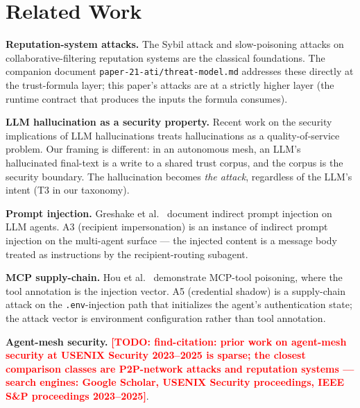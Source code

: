 \documentclass[letterpaper,twocolumn,10pt]{article}
\newcommand{\todo}[1]{\textcolor{red}{\textbf{[TODO: #1]}}}
\begin{document}
\section{Related Work}
\label{sec:related}

\textbf{Reputation-system attacks.} The Sybil attack
\cite{TODO-find-citation-douceur-2002-sybil} and slow-poisoning
attacks on collaborative-filtering reputation systems
\cite{TODO-find-citation-recsys-poisoning} are the classical
foundations. The companion document
\texttt{paper-21-ati/threat-model.md} addresses these directly at
the trust-formula layer; this paper's attacks are at a strictly
higher layer (the runtime contract that produces the inputs the
formula consumes).

\textbf{LLM hallucination as a security property.} Recent work on
the security implications of LLM hallucinations
\cite{TODO-find-citation-llm-hallucination-security-2024} treats
hallucinations as a quality-of-service problem. Our framing is
different: in an autonomous mesh, an LLM's hallucinated final-text
is a write to a shared trust corpus, and the corpus is the security
boundary. The hallucination becomes \emph{the attack}, regardless of
the LLM's intent (T3 in our taxonomy).

\textbf{Prompt injection.} Greshake et al.\
\cite{TODO-find-citation-greshake-prompt-injection-2023} document
indirect prompt injection on LLM agents. A3 (recipient
impersonation) is an instance of indirect prompt injection on the
multi-agent surface --- the injected content is a message body
treated as instructions by the recipient-routing subagent.

\textbf{MCP supply-chain.} Hou et al.\
\cite{TODO-find-citation-hou-mcp-tool-poisoning} demonstrate
MCP-tool poisoning, where the tool annotation is the injection
vector. A5 (credential shadow) is a supply-chain attack on the
\texttt{.env}-injection path that initializes the agent's authentication
state; the attack vector is environment configuration rather than tool
annotation.

\textbf{Agent-mesh security.} \todo{find-citation: prior work on
agent-mesh security at USENIX Security 2023--2025 is sparse; the
closest comparison classes are P2P-network attacks and reputation
systems --- search engines: Google Scholar, USENIX Security
proceedings, IEEE S\&P proceedings 2023--2025}.
\end{document}
